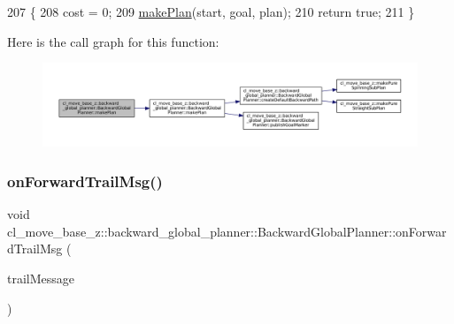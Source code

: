 \begin{DoxyCode}
207 \{
208     cost = 0;
209     \hyperlink{classcl__move__base__z_1_1backward__global__planner_1_1BackwardGlobalPlanner_a3f1f3c81e7c52c9305544fd793741a41}{makePlan}(start, goal, plan);
210     \textcolor{keywordflow}{return} \textcolor{keyword}{true};
211 \}
\end{DoxyCode}
Here is the call graph for this function\+:
\nopagebreak
\begin{figure}[H]
\begin{center}
\leavevmode
\includegraphics[width=350pt]{classcl__move__base__z_1_1backward__global__planner_1_1BackwardGlobalPlanner_a2fe289017031d072f4ac32d017fe989d_cgraph}
\end{center}
\end{figure}
\mbox{\label{classcl__move__base__z_1_1backward__global__planner_1_1BackwardGlobalPlanner_a515bde5bfb3ae548f3e19209df1a48b0}} 
\subsubsection{\texorpdfstring{on\+Forward\+Trail\+Msg()}{onForwardTrailMsg()}}
{\footnotesize\ttfamily void cl\+\_\+move\+\_\+base\+\_\+z\+::backward\+\_\+global\+\_\+planner\+::\+Backward\+Global\+Planner\+::on\+Forward\+Trail\+Msg (\begin{DoxyParamCaption}\item[{const nav\+\_\+msgs\+::\+Path\+::\+Const\+Ptr \&}]{trail\+Message }\end{DoxyParamCaption})\hspace{0.3cm}{\ttfamily [private]}}

